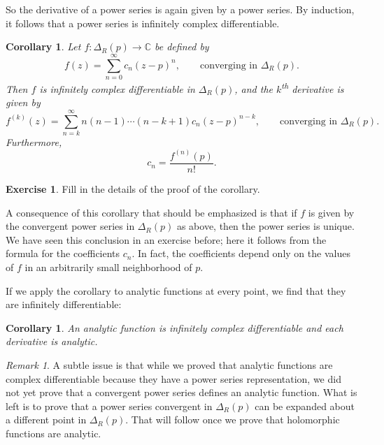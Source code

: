 \documentclass[12pt,openany]{book}
\newcommand{\C}{{\mathbb{C}}}
\theoremstyle{plain}
\newtheorem{cor}[thm]{Corollary}
\theoremstyle{remark}
\newtheorem{remark}[thm]{Remark}
\theoremstyle{definition}
\newenvironment{exbox}{%
    \def\FrameCommand{\vrule width 1pt \relax\hspace{10pt}}%
    \MakeFramed{\advance\hsize-\width\FrameRestore}%
}{%
    \endMakeFramed
}
\theoremstyle{exercise}
\newtheorem{exercise}{Exercise}[section]
\theoremstyle{example}
\begin{document}
So the derivative of a power series is again given by a power series.
By induction, it follows that a power series is infinitely complex
differentiable.

\begin{cor} \label{cor:convpowserinfdif}
\pagebreak[2]
Let $f \colon \Delta_R(p) \to \C$ be defined by
\begin{equation*}
f(z) = \sum_{n=0}^\infty c_n {(z-p)}^n ,
\qquad \text{converging in } \Delta_R(p) .
\end{equation*}
Then $f$ is infinitely complex differentiable in $\Delta_R(p)$,
and the $k$\textsuperscript{th} derivative is given by
\begin{equation*}
f^{(k)}(z) = \sum_{n=k}^\infty n(n-1)\cdots(n-k+1) c_n {(z-p)}^{n-k} ,
\qquad \text{converging in } \Delta_R(p) .
\end{equation*}
Furthermore,
\begin{equation*}
c_n =
\frac{f^{(n)}(p)}{n!} .
\end{equation*}
\end{cor}

\begin{exbox}
\begin{exercise}
Fill in the details of the proof of the corollary.
\end{exercise}
\end{exbox}

A consequence of this corollary that should be
emphasized is that if $f$ is given by the convergent power series in
$\Delta_R(p)$ as above, then the power series is unique.
We have seen this conclusion in an exercise before; here it
follows from the formula for the coefficients $c_n$.  In fact, the
coefficients depend only on the values of $f$ in an arbitrarily small
neighborhood of $p$.

If we apply the corollary to analytic functions at every point,
we find that they are infinitely differentiable:

\begin{cor} \label{cor:analinfdif}
An analytic function is infinitely complex differentiable and each
derivative is analytic.
\end{cor}

\begin{remark}
A subtle issue is that while we proved that analytic functions are
complex differentiable because they have a power series representation,
we did not yet prove that a convergent power series defines an analytic
function.  What is left is to prove that a power series convergent
in $\Delta_R(p)$ can be
expanded about a different point in $\Delta_R(p)$.  That will follow
once we prove that holomorphic functions are analytic.
\end{remark}
\end{document}
